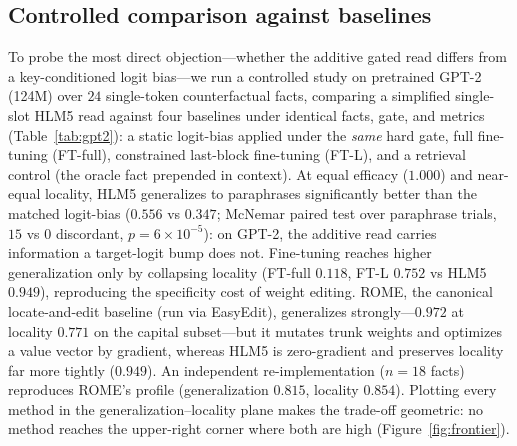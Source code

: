 \documentclass[11pt]{article}
\theoremstyle{remark}
\begin{document}
\subsection{Controlled comparison against baselines}
\label{sec:controlled}

To probe the most direct objection---whether the additive gated read differs from
a key-conditioned logit bias---we run a controlled study on pretrained GPT-2
(124M) over $24$ single-token counterfactual facts, comparing a simplified
single-slot HLM5 read against four baselines under identical facts, gate, and
metrics (Table~\ref{tab:gpt2}): a static logit-bias applied under the \emph{same}
hard gate, full fine-tuning (FT-full), constrained last-block fine-tuning (FT-L),
and a retrieval control (the oracle fact prepended in context). At equal efficacy ($1.000$) and near-equal locality,
HLM5 generalizes to paraphrases significantly better than the matched logit-bias
($0.556$ vs $0.347$; McNemar paired test over paraphrase trials, $15$ vs $0$
discordant, $p=6\times10^{-5}$): on GPT-2, the additive read carries information a
target-logit bump does not. Fine-tuning reaches higher generalization only by
collapsing locality (FT-full $0.118$, FT-L $0.752$ vs HLM5 $0.949$), reproducing
the specificity cost of weight editing. ROME, the canonical locate-and-edit
baseline (run via EasyEdit), generalizes strongly---$0.972$ at locality $0.771$ on
the capital subset---but it mutates trunk weights and optimizes a value vector by
gradient, whereas HLM5 is zero-gradient and preserves locality far more tightly
($0.949$). An independent re-implementation ($n=18$ facts) reproduces ROME's
profile (generalization $0.815$, locality $0.854$). Plotting every method in the
generalization--locality plane makes the trade-off geometric: no method reaches
the upper-right corner where both are high (Figure~\ref{fig:frontier}).
\end{document}
